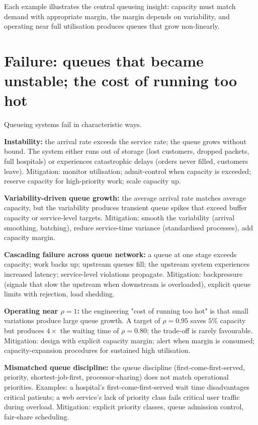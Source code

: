 Each example illustrates the central queueing insight: capacity must match demand with appropriate margin, the margin depends on variability, and operating near full utilisation produces queues that grow non-linearly.

\section{Failure: queues that became unstable; the cost of running too hot}

Queueing systems fail in characteristic ways.

\textbf{Instability:} the arrival rate exceeds the service rate; the queue grows without bound. The system either runs out of storage (lost customers, dropped packets, full hospitals) or experiences catastrophic delays (orders never filled, customers leave). Mitigation: monitor utilisation; admit-control when capacity is exceeded; reserve capacity for high-priority work; scale capacity up.

\textbf{Variability-driven queue growth:} the average arrival rate matches average capacity, but the variability produces transient queue spikes that exceed buffer capacity or service-level targets. Mitigation: smooth the variability (arrival smoothing, batching), reduce service-time variance (standardised processes), add capacity margin.

\textbf{Cascading failure across queue network:} a queue at one stage exceeds capacity; work backs up; upstream queues fill; the upstream system experiences increased latency; service-level violations propagate. Mitigation: backpressure (signals that slow the upstream when downstream is overloaded), explicit queue limits with rejection, load shedding.

\textbf{Operating near $\rho = 1$:} the engineering "cost of running too hot" is that small variations produce large queue growth. A target of $\rho = 0.95$ saves $5\%$ capacity but produces $4\times$ the waiting time of $\rho = 0.80$; the trade-off is rarely favourable. Mitigation: design with explicit capacity margin; alert when margin is consumed; capacity-expansion procedures for sustained high utilisation.

\textbf{Mismatched queue discipline:} the queue discipline (first-come-first-served, priority, shortest-job-first, processor-sharing) does not match operational priorities. Examples: a hospital's first-come-first-served wait time disadvantages critical patients; a web service's lack of priority class fails critical user traffic during overload. Mitigation: explicit priority classes, queue admission control, fair-share scheduling.

